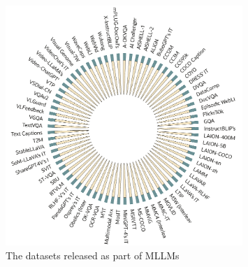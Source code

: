 \documentclass[runningheads]{llncs}
\begin{document}
   \begin{figure}[t!]
     	\centering
     	\includegraphics[width=0.8\textwidth]{18.png} %
     	\caption{The datasets released as part of MLLMs}
     	\label{fig:fig_mllm}
        \vspace{-1em}
     \end{figure}
\end{document}
